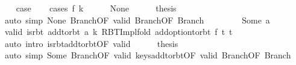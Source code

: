 \begin{isabellebody}
\ \ \isamarkupfalse%
\ {\isacharquery}{\kern0pt}case\isanewline
\ \ \isamarkupfalse%
\ {\isacharparenleft}{\kern0pt}cases\ {\isachardoublequoteopen}f\ k{\isachardoublequoteclose}{\isacharparenright}{\kern0pt}\isanewline
\ \ \ \ \isamarkupfalse%
\ None\isanewline
\ \ \ \ \isamarkupfalse%
\ {\isacharquery}{\kern0pt}thesis\isanewline
\ \ \ \ \ \ \isamarkupfalse%
\ {\isacharparenleft}{\kern0pt}auto\ simp{\isacharcolon}{\kern0pt}\ None\ Branch{\isacharparenleft}{\kern0pt}{}{\isacharparenright}{\kern0pt}{\isacharbrackleft}{\kern0pt}OF\ valid{\isacharbrackright}{\kern0pt}\ Branch{\isacharparenleft}{\kern0pt}{}{\isacharparenright}{\kern0pt}{\isacharbrackleft}{\kern0pt}OF\ Branch{\isacharparenleft}{\kern0pt}{}{\isacharparenright}{\kern0pt}{\isacharbrackright}{\kern0pt}{\isacharparenright}{\kern0pt}\isanewline
\ \ \isamarkupfalse%
\isanewline
\ \ \ \ \isamarkupfalse%
\ {\isacharparenleft}{\kern0pt}Some\ a{\isacharparenright}{\kern0pt}\isanewline
\ \ \ \ \isamarkupfalse%
\ valid{\isacharprime}{\kern0pt}{\isacharcolon}{\kern0pt}\ {\isachardoublequoteopen}is{\isacharunderscore}{\kern0pt}rbt\ {\isacharparenleft}{\kern0pt}add{\isacharunderscore}{\kern0pt}to{\isacharunderscore}{\kern0pt}rbt\ {\isacharparenleft}{\kern0pt}a{\isacharcomma}{\kern0pt}\ k{\isacharparenright}{\kern0pt}\ {\isacharparenleft}{\kern0pt}RBT{\isacharunderscore}{\kern0pt}Impl{\isachardot}{\kern0pt}fold\ {\isacharparenleft}{\kern0pt}add{\isacharunderscore}{\kern0pt}option{\isacharunderscore}{\kern0pt}to{\isacharunderscore}{\kern0pt}rbt\ f{\isacharparenright}{\kern0pt}\ t{}\ t{\isacharprime}{\kern0pt}{\isacharparenright}{\kern0pt}{\isacharparenright}{\kern0pt}{\isachardoublequoteclose}\isanewline
\ \ \ \ \ \ \isamarkupfalse%
\ {\isacharparenleft}{\kern0pt}auto\ intro{\isacharcolon}{\kern0pt}\ is{\isacharunderscore}{\kern0pt}rbt{\isacharunderscore}{\kern0pt}add{\isacharunderscore}{\kern0pt}to{\isacharunderscore}{\kern0pt}rbt{\isacharbrackleft}{\kern0pt}OF\ valid{\isacharbrackright}{\kern0pt}{\isacharparenright}{\kern0pt}\isanewline
\ \ \ \ \isamarkupfalse%
\ {\isacharquery}{\kern0pt}thesis\isanewline
\ \ \ \ \ \ \isamarkupfalse%
\ {\isacharparenleft}{\kern0pt}auto\ simp{\isacharcolon}{\kern0pt}\ Some\ Branch{\isacharparenleft}{\kern0pt}{}{\isacharparenright}{\kern0pt}{\isacharbrackleft}{\kern0pt}OF\ valid{\isacharprime}{\kern0pt}{\isacharbrackright}{\kern0pt}\ keys{\isacharunderscore}{\kern0pt}add{\isacharunderscore}{\kern0pt}to{\isacharunderscore}{\kern0pt}rbt{\isacharbrackleft}{\kern0pt}OF\ valid{\isacharbrackright}{\kern0pt}\ Branch{\isacharparenleft}{\kern0pt}{}{\isacharparenright}{\kern0pt}{\isacharbrackleft}{\kern0pt}OF\ Branch{\isacharparenleft}{\kern0pt}{}{\isacharparenright}{\kern0pt}{\isacharbrackright}{\kern0pt}{\isacharparenright}{\kern0pt}\isanewline

\end{isabellebody}
